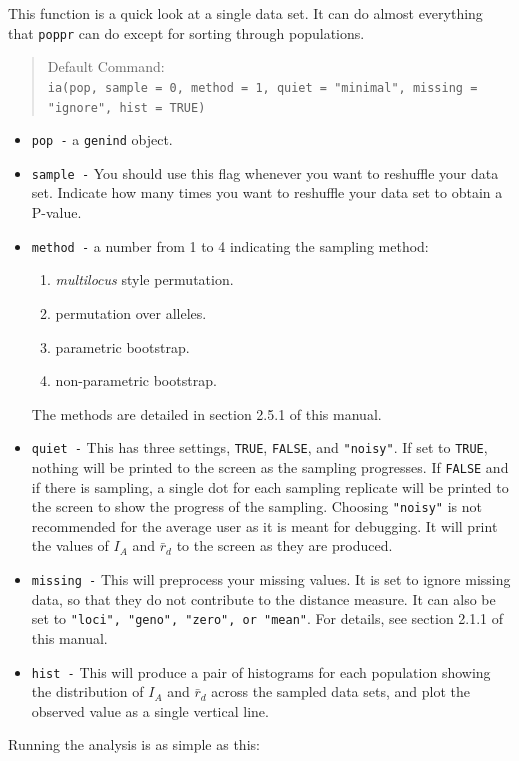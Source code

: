 \documentclass[letterpaper]{article}
\newcommand{\tab}{\hspace*{1em}}
\begin{document}
\tab\tab This function is a quick look at a single data set. It can do almost everything that \texttt{poppr} can do except for sorting through populations.
\begin{quote}
Default Command:\\
\texttt{ia(pop, sample = 0, method = 1, quiet = "minimal", missing = "ignore", hist = TRUE)}
\end{quote}
\begin{itemize}
  \item \texttt{pop -} a \texttt{genind} object.
  \item \texttt{sample -} You should use this flag whenever you want to reshuffle your data set. Indicate how many times you want to reshuffle your data set to obtain a P-value. 
  \item \texttt{method -} a number from 1 to 4 indicating the sampling method:
  \begin{enumerate}
    \item \textit{multilocus} style permutation. \cite{Agapow:2001}
    \item permutation over alleles.
    \item parametric bootstrap.
    \item non-parametric bootstrap.
  \end{enumerate}
  The methods are detailed in section 2.5.1 of this manual.
  \item \texttt{quiet -} This has three settings, \texttt{TRUE}, \texttt{FALSE}, and \texttt{"noisy"}. If set to \texttt{TRUE}, nothing will be printed to the screen as the sampling progresses. If \texttt{FALSE} and if there is sampling, a single dot for each sampling replicate will be printed to the screen to show the progress of the sampling. Choosing \texttt{"noisy"} is not recommended for the average user as it is meant for debugging. It will print the values of $I_A$ and $\bar r_d$ to the screen as they are produced. 
  \item \texttt{missing -} This will preprocess your missing values. It is set to ignore missing data, so that they do not contribute to the distance measure. It can also be set to \texttt{"loci", "geno", "zero", or "mean"}. For details, see section 2.1.1 of this manual.
  \item \texttt{hist -} This will produce a pair of histograms for each population showing the distribution of $I_A$ and $\bar r_d$ across the sampled data sets, and plot the observed value as a single vertical line.
\end{itemize}
Running the analysis is as simple as this:
\end{document}
